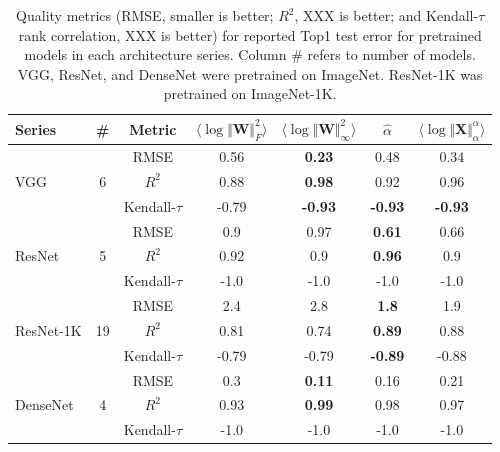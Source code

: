 \begin{table}[t]
\small
\begin{center}
\begin{tabular}{|p{1in}|c|c|c|c|c|c|}
\hline
 Series                      & \#                    & Metric         & $\langle\log\Vert\mathbf{W}\Vert^{2}_{F}\rangle$ & $\langle\log\Vert\mathbf{W}\Vert^{2}_{\infty}\rangle$ & $\hat{\alpha}$ & $\langle\log\Vert\mathbf{X}\Vert^{\alpha}_{\alpha}\rangle$ \\
\hline
\multirow{3}{4em}{VGG}       & \multirow{3}{1em}{6}  & RMSE           & 0.56 & \textbf{0.23} & 0.48          & 0.34  \\
                             &                       & $R^2$          & 0.88 & \textbf{0.98} &  0.92         &  0.96           \\
                             &                       & Kendall-$\tau$ & -0.79 &  \textbf{-0.93} & \textbf{-0.93} & \textbf{-0.93}        \\
\hline
\multirow{3}{4em}{ResNet}    & \multirow{3}{1em}{5}  & RMSE           &  0.9 & 0.97 & \textbf{0.61} & 0.66        \\
                             &                       & $R^2$          &  0.92 &  0.9 &  \textbf{0.96}   &  0.9         \\
                             &                       & Kendall-$\tau$ &  -1.0 &  -1.0 &  -1.0          &  -1.0        \\
\hline
\multirow{3}{4em}{ResNet-1K} & \multirow{3}{1em}{19} & RMSE           &  2.4 & 2.8  & \textbf{1.8}  & 1.9          \\
                             &                       & $R^2$          &  0.81 &  0.74 &  \textbf{0.89}    &  0.88           \\
                             &                       & Kendall-$\tau$ &  -0.79 &  -0.79 &  \textbf{-0.89}  &  -0.88           \\
\hline
\multirow{3}{4em}{DenseNet}  & \multirow{3}{1em}{4}  & RMSE           &  0.3 & \textbf{0.11}  & 0.16 & 0.21       \\
                             &                       & $R^2$          &  0.93 &  \textbf{0.99} &  0.98      &  0.97    \\
                             &                       & Kendall-$\tau$ &  -1.0 &  -1.0 &  -1.0         &  -1.0     \\
\hline
\end{tabular}
\end{center}
\caption{Quality metrics 
         (RMSE, smaller is better; $R^2$, XXX is better; and Kendall-$\tau$ rank correlation, XXX is better)
         for reported Top1 test error for pretrained models in each architecture series.  
         Column \# refers to number of models.  
         VGG, ResNet, and DenseNet were pretrained on ImageNet.  
         ResNet-1K was pretrained on ImageNet-1K. 
}
\label{table:cv-models}
\end{table}

